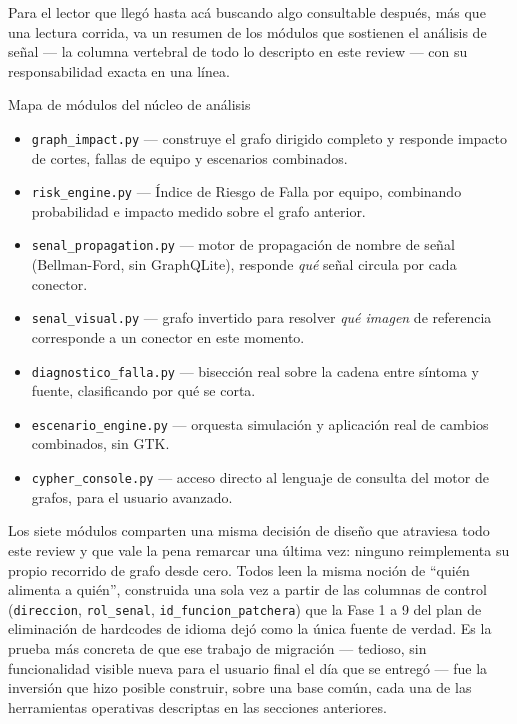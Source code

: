 \documentclass[11pt,twocolumn]{article}
\begin{document}
Para el lector que llegó hasta acá buscando algo consultable después, más que una lectura corrida, va un resumen de los módulos que sostienen el análisis de señal --- la columna vertebral de todo lo descripto en este review --- con su responsabilidad exacta en una línea.

\begin{specbox}{Mapa de módulos del núcleo de análisis}
\begin{itemize}[leftmargin=1.1em,itemsep=2pt,topsep=2pt]
\item \texttt{graph\_impact.py} --- construye el grafo dirigido completo y responde impacto de cortes, fallas de equipo y escenarios combinados.
\item \texttt{risk\_engine.py} --- Índice de Riesgo de Falla por equipo, combinando probabilidad e impacto medido sobre el grafo anterior.
\item \texttt{senal\_propagation.py} --- motor de propagación de nombre de señal (Bellman-Ford, sin GraphQLite), responde \emph{qué} señal circula por cada conector.
\item \texttt{senal\_visual.py} --- grafo invertido para resolver \emph{qué imagen} de referencia corresponde a un conector en este momento.
\item \texttt{diagnostico\_falla.py} --- bisección real sobre la cadena entre síntoma y fuente, clasificando por qué se corta.
\item \texttt{escenario\_engine.py} --- orquesta simulación y aplicación real de cambios combinados, sin GTK.
\item \texttt{cypher\_console.py} --- acceso directo al lenguaje de consulta del motor de grafos, para el usuario avanzado.
\end{itemize}
\end{specbox}

Los siete módulos comparten una misma decisión de diseño que atraviesa todo este review y que vale la pena remarcar una última vez: ninguno reimplementa su propio recorrido de grafo desde cero. Todos leen la misma noción de ``quién alimenta a quién'', construida una sola vez a partir de las columnas de control (\texttt{direccion}, \texttt{rol\_senal}, \texttt{id\_funcion\_patchera}) que la Fase 1 a 9 del plan de eliminación de hardcodes de idioma dejó como la única fuente de verdad. Es la prueba más concreta de que ese trabajo de migración --- tedioso, sin funcionalidad visible nueva para el usuario final el día que se entregó --- fue la inversión que hizo posible construir, sobre una base común, cada una de las herramientas operativas descriptas en las secciones anteriores.
\end{document}

